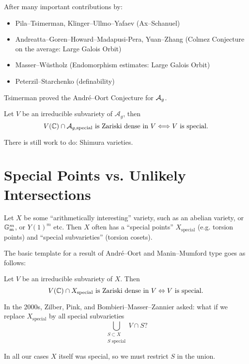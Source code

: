 \documentclass{beamer}
\begin{document}
\begin{frame}
  After many important contributions by:

  \begin{itemize}
  \item  Pila--Tsimerman, Klinger--Ullmo--Yafaev (Ax--Schanuel)
  \item   Andreatta--Goren--Howard--Madapusi-Pera, Yuan--Zhang (Colmez
    Conjecture on the average: Large Galois Orbit)
  \item Masser--Wüstholz (Endomorphism estimates: Large Galois Orbit)
  \item   Peterzil--Starchenko (definability)    
  \end{itemize}

  Tsimerman proved the Andr\'e--Oort Conjecture for ${\mathcal A}_g$. 
  \begin{theorem}[Tsimerman]
    Let $V$ be an irreducible subvariety of $\mathcal{A}_g$, then
    \begin{equation*}
      V({\mathbb{C}})\cap \mathcal{A}_{g,\mathrm{special}} \text{ is Zariski
        dense in $V$}\Longleftrightarrow V\text{ is special.}
    \end{equation*}
  \end{theorem}

  There is still work to do: Shimura varieties.
\end{frame}

\section{Special Points vs. Unlikely Intersections}

\begin{frame}

  Let $X$ be some ``arithmetically interesting'' variety, such as an
  abelian variety, or ${\mathbb{G}}_{\mathrm{m}}^m$, or $Y(1)^m$ etc.
  Then $X$  often has
  a ``special points'' $X_{\mathrm{special}}$ (e.g. torsion points) and ``special
  subvarieties'' (torsion cosets).

  The basic template for a result of Andr\'e--Oort and Manin--Mumford
  type goes as follows:
  
  Let $V$ be an irreducible subvariety of
  $X$. Then
  \begin{equation*}
    V({\mathbb{C}}) \cap X_{\mathrm{special}}\text{ is Zariski dense in
      $V$}\Leftrightarrow \text{$V$ is special}.
  \end{equation*}

  In the 2000s,
  Zilber, Pink, and Bombieri--Masser--Zannier asked: what if we
  replace $X_{\mathrm{special}}$ by all special subvarieties
  \begin{equation*}
    \bigcup_{\substack{S\subset X \\ \text{$S$ special}}} V\cap S?
  \end{equation*}

  In all our cases $X$ itself was special, so we must restrict
  $S$ in the union.  
\end{frame}
\end{document}

